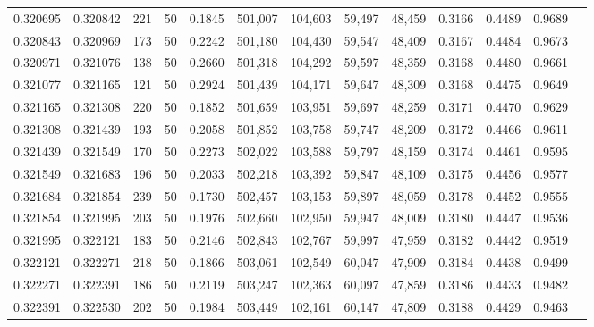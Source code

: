 \begin{tabular}{rrrrrrrrrrrrr}
0.320695 & 0.320842 &   221 &  50 &                                     0.1845 & 501,007 & 104,603 &  59,497 &  48,459 & 0.3166 & 0.4489 & 0.9689 \\
0.320843 & 0.320969 &   173 &  50 &                                     0.2242 & 501,180 & 104,430 &  59,547 &  48,409 & 0.3167 & 0.4484 & 0.9673 \\
0.320971 & 0.321076 &   138 &  50 &                                     0.2660 & 501,318 & 104,292 &  59,597 &  48,359 & 0.3168 & 0.4480 & 0.9661 \\
0.321077 & 0.321165 &   121 &  50 &                                     0.2924 & 501,439 & 104,171 &  59,647 &  48,309 & 0.3168 & 0.4475 & 0.9649 \\
0.321165 & 0.321308 &   220 &  50 &                                     0.1852 & 501,659 & 103,951 &  59,697 &  48,259 & 0.3171 & 0.4470 & 0.9629 \\
0.321308 & 0.321439 &   193 &  50 &                                     0.2058 & 501,852 & 103,758 &  59,747 &  48,209 & 0.3172 & 0.4466 & 0.9611 \\
0.321439 & 0.321549 &   170 &  50 &                                     0.2273 & 502,022 & 103,588 &  59,797 &  48,159 & 0.3174 & 0.4461 & 0.9595 \\
0.321549 & 0.321683 &   196 &  50 &                                     0.2033 & 502,218 & 103,392 &  59,847 &  48,109 & 0.3175 & 0.4456 & 0.9577 \\
0.321684 & 0.321854 &   239 &  50 &                                     0.1730 & 502,457 & 103,153 &  59,897 &  48,059 & 0.3178 & 0.4452 & 0.9555 \\
0.321854 & 0.321995 &   203 &  50 &                                     0.1976 & 502,660 & 102,950 &  59,947 &  48,009 & 0.3180 & 0.4447 & 0.9536 \\
0.321995 & 0.322121 &   183 &  50 &                                     0.2146 & 502,843 & 102,767 &  59,997 &  47,959 & 0.3182 & 0.4442 & 0.9519 \\
0.322121 & 0.322271 &   218 &  50 &                                     0.1866 & 503,061 & 102,549 &  60,047 &  47,909 & 0.3184 & 0.4438 & 0.9499 \\
0.322271 & 0.322391 &   186 &  50 &                                     0.2119 & 503,247 & 102,363 &  60,097 &  47,859 & 0.3186 & 0.4433 & 0.9482 \\
0.322391 & 0.322530 &   202 &  50 &                                     0.1984 & 503,449 & 102,161 &  60,147 &  47,809 & 0.3188 & 0.4429 & 0.9463 \\

\end{tabular}
